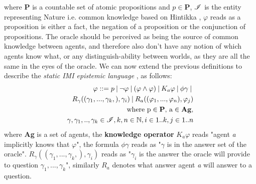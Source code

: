 where \textbf{P} is a countable set of atomic propositions and $p \in
	\mathbf{P}$, $\mathscr{I}$ is the entity representing Nature i.e. common knowledge
based on Hintikka \cite{hintikka88}, $\varphi$ reads as a proposition is either
a fact, the negation of a proposition or the conjunction of propositions. The oracle should be perceived as being the source of common knowledge between agents, and therefore also don't have any notion of which agents know what, or any distinguish-ability between worlds, as they are all the same in the eyes of the oracle.
We can now extend the previous definitions to describe the \textit{static IMI
	epistemic language} \staticlang, as follows:
\begin{align*}
	\varphi ::= p \:|\:\neg\varphi\:|\:(\varphi \land \varphi) \:|\: K_a\varphi \:|\: \phi\gamma \:|\: \\ R_\gamma((\gamma_1,...,\gamma_k,), \gamma_i) \:|\: R_a((\varphi_1,...,\varphi_n), \varphi_j) \\ \text{where p} \in \text{\textbf{P}}\text{, a} \in \text{\textbf{Ag}},\\ \gamma, \gamma_1,..,\gamma_k \in \mathscr{I}, k, n \in \mathbb{N}, i \in 1..k, j \in 1..n
\end{align*}
where \textbf{Ag} is a set of agents, the \textbf{knowledge operator} $K_a\varphi$ reads "agent \textit{a} implicitly knows that $\varphi$", the formula $\phi\gamma$ reads as "$\gamma$ is in the answer set of the oracle". $R_\gamma((\gamma_1,...,\gamma_k,), \gamma_i)$ reads as "$\gamma_i$ is the answer the oracle will provide to question $\gamma_1,...,\gamma_k$", similarly $R_a$ denotes what answer agent \textit{a} will answer to a question. \\

